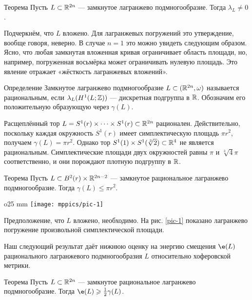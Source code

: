 \begin{thm}[(\cite{G1})]{Теорема}\label{3.2.A}
Пусть $L \subset \mathbb{R}^{2n}$ --- замкнутое лагранжево подмногообразие.
Тогда $\lambda_L \ne 0$.
\end{thm}

Подчеркнём, что $L$ вложено.
Для лагранжевых погружений это утверждение, вообще говоря, неверно.
В случае $n = 1$ это можно увидеть следующим образом.
Ясно, что любая замкнутая вложенная кривая ограничивает область  площади, но, например, погруженная восьмёрка может ограничивать нулевую площадь.
Это явление отражает «жёсткость лагранжевых вложений».

\begin{thm*}{Определение}
Замкнутое лагранжево подмногообразие $L \subset (\mathbb{R}^{2n}, \omega)$ называется рациональным, если $\lambda_L (H^1 (L; \mathbb{Z}))$ --- дискретная подгруппа в $\mathbb{R}$.
Обозначим его положительную образующую через $\gamma (L)$.
\end{thm*}

Расщеплённый тор $L = S^1 (r) \times\dots\times S^1 (r) \subset \mathbb{R}^{2n}$ рационален.
Действительно, поскольку каждая окружность $S^1 (r)$ имеет симплектическую площадь $\pi r^2$, получаем $\gamma (L) = \pi r^2$.
Однако тор $S^1(1)\times S^1(\sqrt[3]{2}) \subset \mathbb{R}^4$ не является рациональным.
Симплектические площади двух окружностей равны $\pi$  и $\sqrt[3]{4}\pi$ соответственно, и они порождают плотную подгруппу в $\mathbb{R}$.

\begin{thm}[(\cite{S1})]{Теорема}\label{3.2.B}
Пусть $L \subset B^2 (r) \times \mathbb{R}^{2n - 2}$ --- замкнутое рациональное лагранжево подмногообразие.
Тогда $\gamma (L) \le \pi r^2$.
\end{thm}

\begin{wrapfigure}[6]{o}{25 mm}
\vskip-3mm
\centering
\texttt{[image: mppics/pic-1]}
\caption{}\label{pic-1}
\vskip0mm
\end{wrapfigure}

Предположение, что $L$ вложено, необходимо.
На рис. \ref{pic-1} показано лагранжево погружение произвольной симплектической площади.

Наш следующий результат даёт нижнюю оценку на энергию смещения $\e (L)$ рационального лагранжевого подмногообразия $L$ относительно хоферовской метрики.


\begin{thm}{Теорема}\label{3.2.C}
Пусть $L \subset \mathbb{R}^{2n}$ --- замкнутое рациональное лагранжево подмногообразие.
Тогда $\e (L) \ge \tfrac12 \gamma (L)$.
\end{thm}

